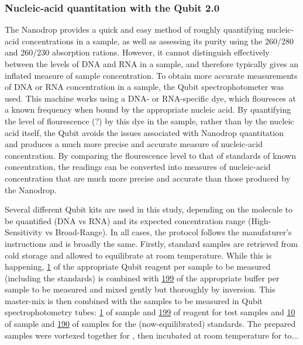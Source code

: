 \subsubsection{Nucleic-acid quantitation with the Qubit 2.0} %

The Nanodrop provides a quick and easy method of roughly quantifying nucleic-acid concentrations in a sample, as well as assessing its purity using the 260/280 and 260/230 absorption rations. However, it cannot distinguish effectively between the levels of DNA and RNA in a sample, and therefore typically gives an inflated measure of sample concentration. To obtain more accurate measurements of DNA or RNA concentration in a sample, the Qubit spectrophotometer was used. %
This machine works using a DNA- or RNA-specific dye, which flouresces at a known frequency when bound by the appropriate nucleic acid. %
By quantifying the level of flourescence (?) by this dye in the sample, rather than by the nucleic acid itself, the Qubit avoids the issues associated with Nanodrop quantitation and produces a much more precise and accurate measure of nucleic-acid concentration. By comparing the flourescence level to that of standards of known concentration, the readings can be converted into measures of nucleic-acid concentration that are much more precise and accurate than those produced by the Nanodrop.

Several different Qubit kits are used in this study, depending on the molecule to be quantified (DNA vs RNA) and its expected concentration range (High-Sensitivity vs Broad-Range). In all cases, the protocol follows the manufaturer's instructions %
and is broadly the same. Firstly, standard samples are retrieved from cold storage and allowed to equilibrate at room temperature. While this is happening, \ul{1} of the appropriate Qubit reagent per sample to be measured (including the standards) is combined with \ul{199} of the appropriate buffer per sample to be measured and mixed gently but thoroughly by inversion. This master-mix is then combined with the samples to be measured in Qubit spectrophotometry tubes: \ul{1} of sample and \ul{199} of reagent for test samples and \ul{10} of sample and \ul{190} of samples for the (now-equilibrated) standards. The prepared samples were vortexed together for , then incubated at room temperature for  to... %

